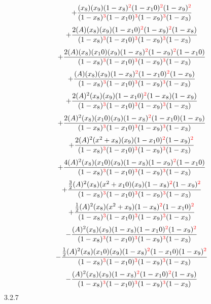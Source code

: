 \documentclass{article}
\begin{document}
\[+\frac{(x_8)(x_9)(1-x_8)^{\textcolor{red}{2}}(1-x_10)^{\textcolor{red}{2}}(1-x_9)^{\textcolor{red}{2}}}{(1-x_8)^{\textcolor{red}{3}}(1-x_10)^{\textcolor{red}{3}}(1-x_9)^{\textcolor{red}{3}}(1-x_3)}\]\[+\frac{2(A)(x_8)(x_9)(1-x_10)^{\textcolor{red}{2}}(1-x_9)^{\textcolor{red}{2}}(1-x_8)}{(1-x_8)^{\textcolor{red}{3}}(1-x_10)^{\textcolor{red}{3}}(1-x_9)^{\textcolor{red}{3}}(1-x_3)}\]\[+\frac{2(A)(x_8)(x_10)(x_9)(1-x_8)^{\textcolor{red}{2}}(1-x_9)^{\textcolor{red}{2}}(1-x_10)}{(1-x_8)^{\textcolor{red}{3}}(1-x_10)^{\textcolor{red}{3}}(1-x_9)^{\textcolor{red}{3}}(1-x_3)}\]\[+\frac{(A)(x_8)(x_9)(1-x_8)^{\textcolor{red}{2}}(1-x_10)^{\textcolor{red}{2}}(1-x_9)}{(1-x_8)^{\textcolor{red}{3}}(1-x_10)^{\textcolor{red}{3}}(1-x_9)^{\textcolor{red}{3}}(1-x_3)}\]\[+\frac{2(A)^{2}(x_8)(x_9)(1-x_10)^{\textcolor{red}{2}}(1-x_8)(1-x_9)}{(1-x_8)^{\textcolor{red}{3}}(1-x_10)^{\textcolor{red}{3}}(1-x_9)^{\textcolor{red}{3}}(1-x_3)}\]\[+\frac{2(A)^{2}(x_8)(x_10)(x_9)(1-x_8)^{\textcolor{red}{2}}(1-x_10)(1-x_9)}{(1-x_8)^{\textcolor{red}{3}}(1-x_10)^{\textcolor{red}{3}}(1-x_9)^{\textcolor{red}{3}}(1-x_3)}\]\[+\frac{2(A)^{2}(x^{2}+x_8)(x_9)(1-x_10)^{\textcolor{red}{2}}(1-x_9)^{\textcolor{red}{2}}}{(1-x_8)^{\textcolor{red}{3}}(1-x_10)^{\textcolor{red}{3}}(1-x_9)^{\textcolor{red}{3}}(1-x_3)}\]\[+\frac{4(A)^{2}(x_8)(x_10)(x_9)(1-x_8)(1-x_9)^{\textcolor{red}{2}}(1-x_10)}{(1-x_8)^{\textcolor{red}{3}}(1-x_10)^{\textcolor{red}{3}}(1-x_9)^{\textcolor{red}{3}}(1-x_3)}\]\[+\frac{\frac{3}{2}(A)^{2}(x_8)(x^{2}+x_10)(x_9)(1-x_8)^{\textcolor{red}{2}}(1-x_9)^{\textcolor{red}{2}}}{(1-x_8)^{\textcolor{red}{3}}(1-x_10)^{\textcolor{red}{3}}(1-x_9)^{\textcolor{red}{3}}(1-x_3)}\]\[+\frac{\frac{1}{2}(A)^{2}(x_8)(x^{2}+x_9)(1-x_8)^{\textcolor{red}{2}}(1-x_10)^{\textcolor{red}{2}}}{(1-x_8)^{\textcolor{red}{3}}(1-x_10)^{\textcolor{red}{3}}(1-x_9)^{\textcolor{red}{3}}(1-x_3)}\]\[-\frac{(A)^{2}(x_8)(x_9)(1-x_8)(1-x_10)^{\textcolor{red}{2}}(1-x_9)^{\textcolor{red}{2}}}{(1-x_8)^{\textcolor{red}{3}}(1-x_10)^{\textcolor{red}{3}}(1-x_9)^{\textcolor{red}{3}}(1-x_3)}\]\[-\frac{\frac{1}{2}(A)^{2}(x_8)(x_10)(x_9)(1-x_8)^{\textcolor{red}{2}}(1-x_10)(1-x_9)^{\textcolor{red}{2}}}{(1-x_8)^{\textcolor{red}{3}}(1-x_10)^{\textcolor{red}{3}}(1-x_9)^{\textcolor{red}{3}}(1-x_3)}\]\[-\frac{(A)^{2}(x_8)(x_9)(1-x_8)^{\textcolor{red}{2}}(1-x_10)^{\textcolor{red}{2}}(1-x_9)}{(1-x_8)^{\textcolor{red}{3}}(1-x_10)^{\textcolor{red}{3}}(1-x_9)^{\textcolor{red}{3}}(1-x_3)}\]
3.2.7
\end{document}
